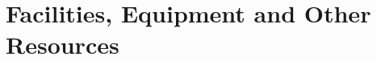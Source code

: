 \documentclass[11pt,oneside,final]{article}
\begin{document}
    \section*{Facilities, Equipment and Other Resources}
\end{document}
